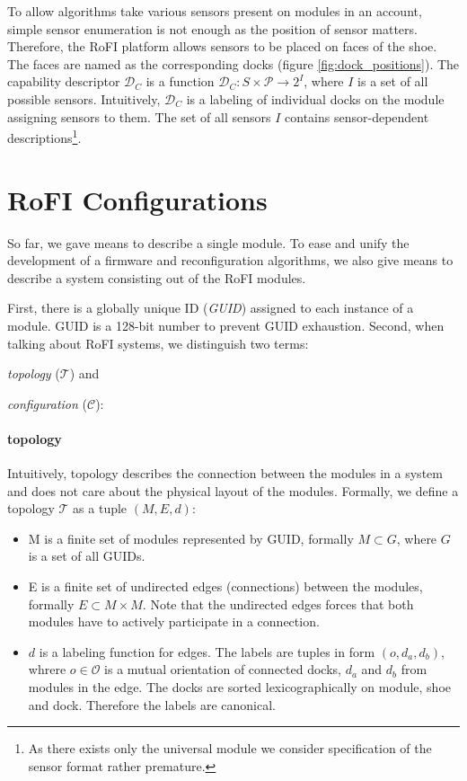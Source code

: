 To allow algorithms take various sensors present on modules in an account,
simple sensor enumeration is not enough as the position of sensor matters.
Therefore, the RoFI platform allows sensors to be placed on faces of the shoe.
The faces are named as the corresponding docks (figure
\ref{fig:dock_positions}). The capability descriptor $\mathcal{D}_C$ is a
function $\mathcal{D}_C: S\times\mathcal{P} \rightarrow 2^{I}$, where $I$ is a
set of all possible sensors. Intuitively, $\mathcal{D}_C$ is a labeling of
individual docks on the module assigning sensors to them. The set of all sensors
$I$ contains sensor-dependent descriptions\footnote{As there exists only the
universal module we consider specification of the sensor format rather
premature.}.

\section{RoFI Configurations} \label{sec:configuration}

So far, we gave means to describe a single module. To ease and unify the
development of a firmware and reconfiguration algorithms, we also give means to
describe a system consisting out of the RoFI modules.

First, there is a globally unique ID (\emph{GUID}) assigned to each instance of
a module. GUID is a 128-bit number to prevent GUID exhaustion. Second, when
talking about RoFI systems, we distinguish two terms:
\begin{enumerate*}
    \item \emph{topology} ($\mathcal{T}$) and
    \item \emph{configuration} ($\mathcal{C}$):
\end{enumerate*}

\paragraph{topology} Intuitively, topology describes the connection between the
modules in a system and does not care about the physical layout of the modules.
Formally, we define a topology $\mathcal{T}$ as a tuple $(M, E, d)$:
\begin{itemize}
    \item M is a finite set of modules represented by GUID, formally $M\subset
    G$, where $G$ is a set of all GUIDs.
    \item E is a finite set of undirected edges (connections) between the
    modules, formally $E\subset M\times M$. Note that the undirected edges
    forces that both modules have to actively participate in a connection.
    \item $d$ is a labeling function for edges. The labels are tuples in form
    $(o, d_a, d_b)$, whrere $o\in\mathcal{O}$ is a mutual orientation of
    connected docks, $d_a$ and $d_b$ from modules in the edge. The docks are
    sorted lexicographically on module, shoe and dock. Therefore the labels are
    canonical.
\end{itemize}

